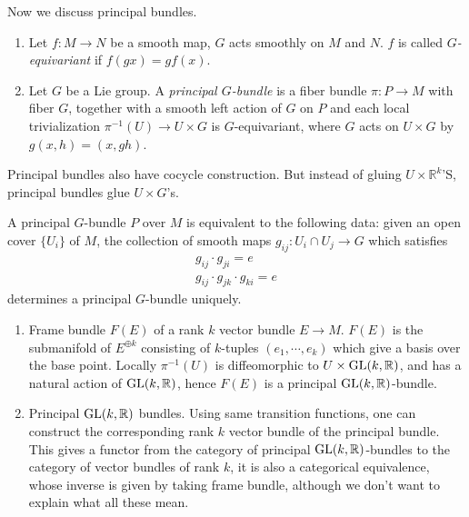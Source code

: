 Now we discuss principal bundles.
\begin{defn}
    \begin{enumerate}[(1)]
        \item Let $f:M\to N$ be a smooth map, $G$ acts smoothly on $M$ and $N$.
        $f$ is called \emph{$G$-equivariant} if $f(gx)=gf(x)$.
        \item Let $G$ be a Lie group.
        A \emph{principal $G$-bundle} is a fiber bundle $\pi:P\to M$ with fiber $G$, together with a smooth left action of $G$ on $P$ and each local trivialization $\pi^{-1}(U)\to U\times G$ is $G$-equivariant, where $G$ acts on $U\times G$ by $g(x,h)=(x,gh)$.
    \end{enumerate}
\end{defn}

Principal bundles also have cocycle construction.
But instead of gluing $U\times\mathbb{R}^k$'S, principal bundles glue $U\times G$'s.
\begin{prop}
    A principal $G$-bundle $P$ over $M$ is equivalent to the following data:
    given an open cover $\{U_i\}$ of $M$, the collection of smooth maps $g_{ij}:U_i\cap U_j\to G$ which satisfies
    \begin{gather*}
        g_{ij}\cdot g_{ji}=e\\
        g_{ij}\cdot g_{jk}\cdot g_{ki}=e
    \end{gather*}
    determines a principal $G$-bundle uniquely.
\end{prop}

\begin{eg}
    \begin{enumerate}[(1)]
        \item Frame bundle $F(E)$ of a rank $k$ vector bundle $E\to M$.
        $F(E)$ is the submanifold of $E^{\oplus k}$ consisting of $k$-tuples $(e_1,\cdots,e_k)$ which give a basis over the base point.
        Locally $\pi^{-1}(U)$ is diffeomorphic to $U\times\mathrm{GL}(k,\mathbb{R})$, and has a natural action of $\mathrm{GL}(k,\mathbb{R})$, hence $F(E)$ is a principal $\mathrm{GL}(k,\mathbb{R})$-bundle.
        \item Principal $\mathrm{GL}(k,\mathbb{R})$ bundles.
        Using same transition functions, one can construct the corresponding rank $k$ vector bundle of the principal bundle.
        This gives a functor from the category of principal $\mathrm{GL}(k,\mathbb{R})$-bundles to the category of vector bundles of rank $k$, it is also a categorical equivalence, whose inverse is given by taking frame bundle, although we don't want to explain what all these mean.
    \end{enumerate}
\end{eg}

